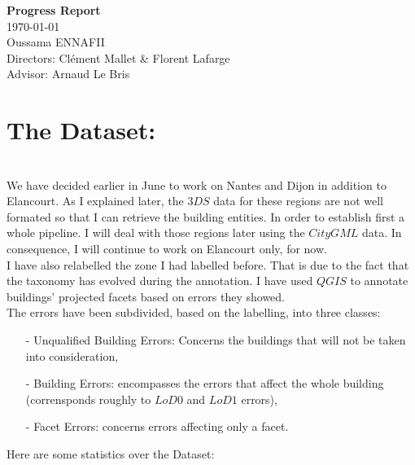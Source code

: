 \documentclass[a4paper, 11pt]{article}
\begin{document}
	\begin{centering}
		\Large{\textbf{Progress Report}}\\
		\large{\today}
~\\
		Oussama ENNAFII\\
		Directors: Cl\'ement Mallet \& Florent Lafarge \\
		Advisor: Arnaud Le Bris \\

	\end{centering}


	\section{The Dataset:}
~\\

	We have decided earlier in June to work on Nantes and Dijon in addition to
	Elancourt. As I explained later, the $3DS$ data for these regions are not
	well formated so that I can retrieve the building entities. In order to
	establish first a whole pipeline. I will deal with those regions later using
	the $CityGML$ data. In consequence, I will continue to work on Elancourt
	only, for now.\\

	I have also relabelled the zone I had labelled before. That is due to the fact
	that the taxonomy has evolved during the annotation. I have used $QGIS$ to
	annotate buildings' projected facets based on errors they showed.\\

	The errors have been subdivided, based on the labelling, into three classes:

	\begin{itemize}
		\item[-] Unqualified Building Errors: Concerns the buildings that will not
		be taken into consideration,
		\item[-] Building Errors: encompasses the errors that affect the whole
		building (corrensponds roughly to $LoD0$ and $LoD1$ errors),
		\item[-] Facet Errors: concerns errors affecting only a facet.
	\end{itemize}

	Here are some statistics over the Dataset:
\end{document}
